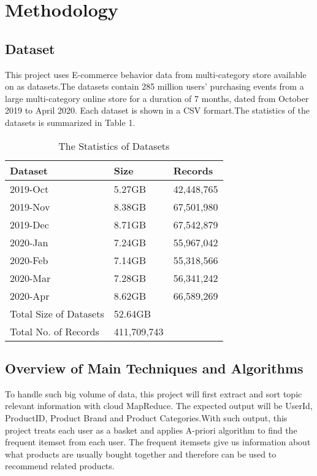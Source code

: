 \documentclass[sigconf,authordraft]{acmart}
\begin{document}
\section{Methodology}

\subsection{Dataset}
This project uses E-commerce behavior data from multi-category store available on\cite{market.org} as datasets.The datasets contain 285 million users’ purchasing events from a large multi-category online store for a duration of 7 months, dated from October 2019 to April 2020. Each dataset is shown in a CSV formart.The statistics of the datasets is summarized in Table 1.
\begin{table}[H]
    \centering
    \caption{The Statistics of Datasets}
    \label{Table 1}
    \begin{tabular}{lll}
\hline
Dataset              & Size         & Records                \\
\hline
2019-Oct             & 5.27GB       & 42,448,765              \\
2019-Nov             & 8.38GB       & 67,501,980              \\
2019-Dec             & 8.71GB       & 67,542,879              \\
2020-Jan             & 7.24GB       & 55,967,042              \\             
2020-Feb             & 7.14GB       & 55,318,566              \\           
2020-Mar             & 7.28GB       & 56,341,242              \\        
2020-Apr             & 8.62GB       & 66,589,269              \\
\hline
Total Size of Datasets & 52.64GB                             \\
Total No. of Records & 411,709,743                          
\\
\hline
\end{tabular}
\end{table}


\subsection{Overview of Main Techniques and Algorithms}
To handle such big volume of data, this project will first extract and sort topic relevant information with cloud MapReduce. The expected output will be UserId, ProductID, Product Brand and Product Categories.With such output, this project treats each user as a basket and applies A-priori algorithm to find the frequent itemset from each user. The frequent itemsets give us information about what products are usually bought together and therefore can be used to recommend related products.\\
\end{document}
